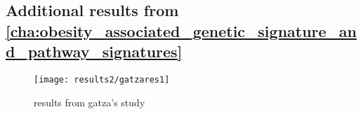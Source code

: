 \begin{appendices}
	\chapter{Additional results from \cref{cha:obesity_associated_genetic_signature_and_pathway_signatures}}
	\label{app:b}

	\begin{figure}[htpb]
		\centering
		\texttt{[image: results2/gatzares1]}
		\caption{results from gatza's study}
		\label{fig:gatza_paper_res}
	\end{figure}



\end{appendices}
